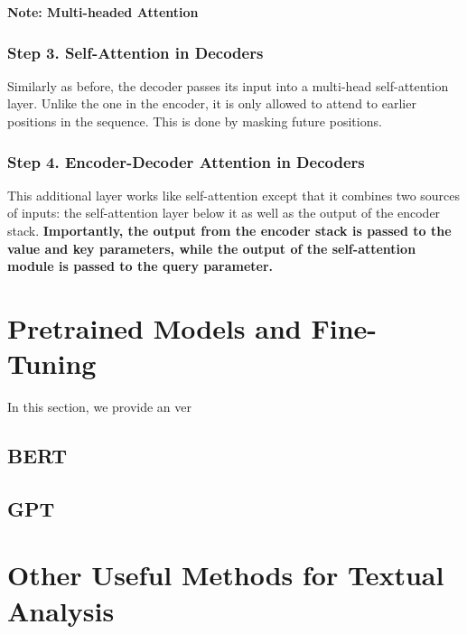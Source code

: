 \documentclass[
]{book}
\begin{document}
\textbf{Note: Multi-headed Attention}

\hypertarget{step-3.-self-attention-in-decoders}{%
\subsection{Step 3. Self-Attention in Decoders}\label{step-3.-self-attention-in-decoders}}

Similarly as before, the decoder passes its input into a multi-head self-attention layer. Unlike the one in the encoder, it is only allowed to attend to earlier positions in the sequence. This is done by masking future positions.

\hypertarget{step-4.-encoder-decoder-attention-in-decoders}{%
\subsection{Step 4. Encoder-Decoder Attention in Decoders}\label{step-4.-encoder-decoder-attention-in-decoders}}

This additional layer works like self-attention except that it combines two sources of inputs: the self-attention layer below it as well as the output of the encoder stack. \textbf{Importantly, the output from the encoder stack is passed to the value and key parameters, while the output of the self-attention module is passed to the query parameter.}

\hypertarget{pretrained-models-and-fine-tuning}{%
\chapter{Pretrained Models and Fine-Tuning}\label{pretrained-models-and-fine-tuning}}

In this section, we provide an ver

\hypertarget{bert}{%
\section{BERT}\label{bert}}

\hypertarget{gpt}{%
\section{GPT}\label{gpt}}

\hypertarget{other-useful-methods-for-textual-analysis}{%
\chapter{Other Useful Methods for Textual Analysis}\label{other-useful-methods-for-textual-analysis}}
\end{document}
